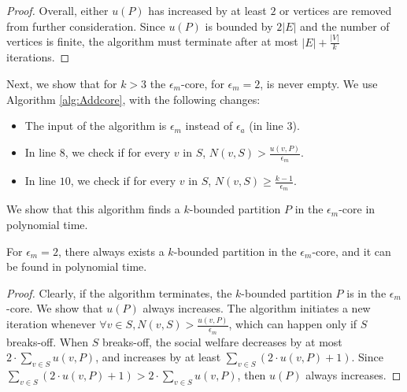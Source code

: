 \documentclass[sigconf,anonymous]{aamas}
\begin{document}
\begin{proof}
Overall, either $u(P)$ has increased by at least $2$ or vertices are removed from further consideration.
Since $u(P)$ is bounded by $2|E|$ and the number of vertices is finite, the algorithm must terminate after at most $|E|+\frac{|V|}{k}$ iterations.
\end{proof}


Next, we show that for $k>3$ the $\epsilon_m$-core, for $\epsilon_m = 2$, is never empty. We use Algorithm \ref{alg:Addcore}, with the following changes:
%
%
\begin{itemize}
    \item The input of the algorithm is $\epsilon_m$ instead of $\epsilon_a$ (in line $3$).
    \item In line $8$, we check if for every $v$ in $S$, $N(v ,S) > \frac{u(v, P)}{\epsilon_m}$.
    \item In line $10$, we check if for every $v$ in $S$, $N(v,S) \geq \frac{k-1}{\epsilon_m}$.
\end{itemize}
We show that this algorithm finds a $k$-bounded partition $P$ in the $\epsilon_m$-core in polynomial time.

\begin{theorem}
For $\epsilon_m = 2$, there always exists a $k$-bounded partition in the $\epsilon_m$-core, and it can be found in polynomial time.
\end{theorem}

\begin{proof}
Clearly, if the algorithm terminates, the $k$-bounded partition $P$ is in the $\epsilon_m$-core.
We show that $u(P)$ always increases.
The algorithm initiates a new iteration whenever $\forall v \in S, N(v ,S) > \frac{u(v, P)}{\epsilon_m}$, which can happen only if $S$ breaks-off.
When $S$ breaks-off, the social welfare decreases by at most $2 \cdot \sum\limits_{v\in S} u(v,P)$, and increases by at least $\sum\limits_{v\in S} (2 \cdot u(v,P)+1)$.
Since $\sum\limits_{v\in S} (2 \cdot u(v,P)+1) > 2 \cdot \sum\limits_{v\in S} u(v,P)$, then $u(P)$ always increases.
\end{proof}
\end{document}
